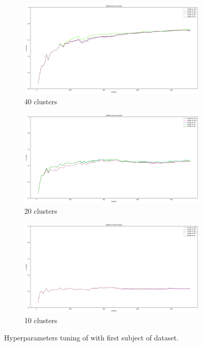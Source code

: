 \begin{figure}
	 \begin{subfigure}[b]{0.49\textwidth}
		 \centering
		 \includegraphics[width=\linewidth]{figures/Banos_S1_shuf_MCNN_40_error_check.png}
		 \caption{40 clusters}
	 \end{subfigure}
	 \begin{subfigure}[b]{0.49\textwidth}
		 \centering
		 \includegraphics[width=\linewidth]{figures/Banos_S1_shuf_MCNN_20_error_check.png}
		 \caption{20 clusters}
	 \end{subfigure}
	 \begin{subfigure}[b]{0.49\textwidth}
		 \centering
		 \includegraphics[width=\linewidth]{figures/Banos_S1_shuf_MCNN_10_error_check.png}
		 \caption{10 clusters}
	 \end{subfigure}
	\caption{Hyperparameters tuning of \mcnn with first subject of \banosdataset dataset. }
	\label{fig:mcnn-tuning-error}
\end{figure}

